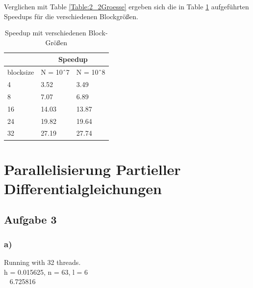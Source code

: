 \documentclass{report}
\begin{document}
Verglichen mit Table \ref{Table:2_2Groesse} ergeben sich die in Table \ref{Table:2_2Speedup} aufgeführten Speedups für die verschiedenen Blockgrößen. 
\begin{table}
	\begin{tabular}{l|l|l|}
		\cline{2-3}
		& \multicolumn{2}{c|}{Speedup} \\ \hline
		\multicolumn{1}{|l|}{blocksize} & N = 10ˆ7      & N = 10ˆ8     \\ \hline
		\multicolumn{1}{|l|}{4}         & 3.52          & 3.49         \\ \hline
		\multicolumn{1}{|l|}{8}         & 7.07          &       6.89       \\ \hline
		\multicolumn{1}{|l|}{16}        & 14.03         &       13.87       \\ \hline
		\multicolumn{1}{|l|}{24}        & 19.82         &     19.64         \\ \hline
		\multicolumn{1}{|l|}{32}        & 27.19         & 27.74        \\ \hline
	\end{tabular}
	\caption{Speedup mit verschiedenen Block-Größen}
	\label{Table:2_2Speedup}
\end{table}
\section{Parallelisierung Partieller Differentialgleichungen}
\subsection{Aufgabe 3}

\subsubsection{a)}

Running with 32 threads.\\
h = 0.015625, n = 63, l = 6\\
~ 6.725816\\
\end{document}
